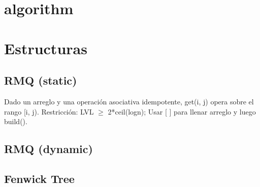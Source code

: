 

\def\title{El Diego 2.0}
\tableofcontents\newpage

 
\section{algorithm}%



\section{Estructuras}%
\subsection{RMQ (static)}
Dado un arreglo y una operación asociativa idempotente, get(i, j) opera sobre el rango [i, j). Restricción: LVL $\ge$ 2*ceil(logn); Usar [ ] para llenar arreglo y luego build().
\subsection{RMQ (dynamic)}
\subsection{Fenwick Tree}
